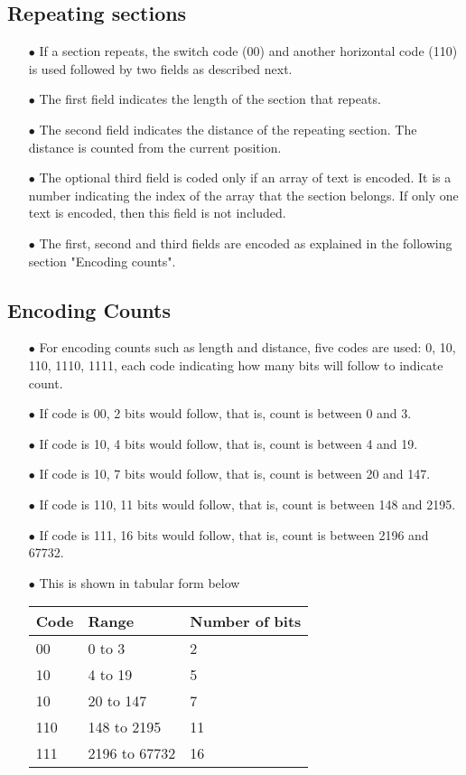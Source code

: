 \documentclass[]{article}
\begin{document}
\subsection{Repeating sections}
\begin{itemize}
	\item[$\bullet$] If a section repeats, the switch code (00) and another horizontal code (110) is used followed by two fields as described next.
  	\item[$\bullet$] The first field indicates the length of the section that repeats.
	\item[$\bullet$] The second field indicates the distance of the repeating section. The distance is counted from the current position.
	\item[$\bullet$] The optional third field is coded only if an array of text is encoded. It is a number indicating the index of the array that the section belongs. If only one text is encoded, then this field is not included. 
	\item[$\bullet$] The first, second and third fields are encoded as explained in the following section "Encoding counts".
\end{itemize}

\subsection{Encoding Counts}
\begin{itemize}
	\item[$\bullet$] For encoding counts such as length and distance, five codes are used: 0, 10, 110, 1110, 1111, each code indicating how many bits will follow to indicate count.
	\item[$\bullet$] If code is 00, 2 bits would follow, that is, count is between 0 and 3.
	\item[$\bullet$] If code is 10, 4 bits would follow, that is, count is between 4 and 19.
	\item[$\bullet$] If code is 10, 7 bits would follow, that is, count is between 20 and 147.
	\item[$\bullet$] If code is 110, 11 bits would follow, that is, count is between 148 and 2195.
	\item[$\bullet$] If code is 111, 16 bits would follow, that is, count is between 2196 and 67732.
	\item[$\bullet$] This is shown in tabular form below
	\item[] \begin{tabular}{ | l | l | l |} \hline
	\textbf{Code} & \textbf{Range} & \textbf{Number of bits} \\ \hline
	00 & 0 to 3 & 2 \\ \hline
	10 & 4 to 19 & 5 \\ \hline
	10 & 20 to 147 & 7 \\ \hline
	110 & 148 to 2195 & 11 \\ \hline
	111 & 2196 to 67732 & 16 \\ \hline
\end{tabular}
\end{itemize}
\end{document}

